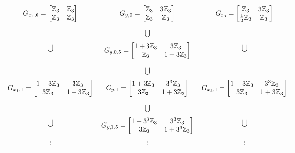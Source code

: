\begin{table}[h]
    \footnotesize
    \begin{center}
        \begin{tabular}{ccc}
            $G_{x_1,0} = \begin{bmatrix}
                \mathbb{Z}_3 & \mathbb{Z}_3 \\ \mathbb{Z}_3 & \mathbb{Z}_3
            \end{bmatrix}$ & $G_{y,0} = \begin{bmatrix}
                \mathbb{Z}_3 & 3 \mathbb{Z}_3 \\ \mathbb{Z}_3 & \mathbb{Z}_3
            \end{bmatrix}$ & $G_{x_3} = \begin{bmatrix}
                \mathbb{Z}_3 & 3 \mathbb{Z}_3 \\ \frac{1}{2} \mathbb{Z}_3 & \mathbb{Z}_3
            \end{bmatrix}$ \\
            & & \\
            & $\bigcup$ & \\
            & & \\
            $\bigcup$ & $G_{y, 0.5} = \begin{bmatrix}
                1 + 3 \mathbb{Z}_3 & 3 \mathbb{Z}_3 \\ \mathbb{Z}_3 & 1 + 3 \mathbb{Z}_3
            \end{bmatrix}$ & $\bigcup$ \\
            & & \\
            & $\bigcup$ & \\
            & & \\
            $G_{x_1, 1} = \begin{bmatrix}
                1 + 3 \mathbb{Z}_3 & 3 \mathbb{Z}_3 \\ 3 \mathbb{Z}_3 & 1 + 3 \mathbb{Z}_3
            \end{bmatrix}$ & $G_{y, 1} = \begin{bmatrix}
                1 + 3 \mathbb{Z}_3 & 3^3 \mathbb{Z}_3 \\ 3 \mathbb{Z}_3 & 1 + 3 \mathbb{Z}_3
            \end{bmatrix}$ & $G_{x_3, 1} = \begin{bmatrix}
                1 + 3 \mathbb{Z}_3 & 3^3 \mathbb{Z}_3 \\ 3 \mathbb{Z}_3 & 1 + 3 \mathbb{Z}_3 
            \end{bmatrix}$ \\
            & & \\
            & $\bigcup$ & \\
            & & \\
            $\bigcup$ & $G_{y, 1.5} = \begin{bmatrix}
                1 + 3^3 \mathbb{Z}_3 & 3^3 \mathbb{Z}_3 \\ 3 \mathbb{Z}_3 & 1 + 3^3 \mathbb{Z}_3
            \end{bmatrix}$ & $\bigcup$ \\
            $\vdots$ & $\vdots$ & $\vdots$
        \end{tabular}
        \label{tab:uncertainty_optimal_bounds}
    \end{center}
\end{table}

